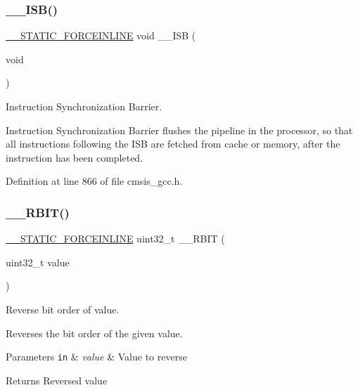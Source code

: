 \subsubsection{\texorpdfstring{\+\_\+\+\_\+\+I\+S\+B()}{\_\_ISB()}}
{\footnotesize\ttfamily \hyperlink{cmsis__iccarm_8h_ab904513442afdf77d4f8c74f23cbb040}{\+\_\+\+\_\+\+S\+T\+A\+T\+I\+C\+\_\+\+F\+O\+R\+C\+E\+I\+N\+L\+I\+NE} void \+\_\+\+\_\+\+I\+SB (\begin{DoxyParamCaption}\item[{void}]{ }\end{DoxyParamCaption})}



Instruction Synchronization Barrier. 

Instruction Synchronization Barrier flushes the pipeline in the processor, so that all instructions following the I\+SB are fetched from cache or memory, after the instruction has been completed. 

Definition at line 866 of file cmsis\+\_\+gcc.\+h.

\mbox{\label{group___c_m_s_i_s___core___instruction_interface_gaf944a7b7d8fd70164cca27669316bcf7}} 
\subsubsection{\texorpdfstring{\+\_\+\+\_\+\+R\+B\+I\+T()}{\_\_RBIT()}}
{\footnotesize\ttfamily \hyperlink{cmsis__iccarm_8h_ab904513442afdf77d4f8c74f23cbb040}{\+\_\+\+\_\+\+S\+T\+A\+T\+I\+C\+\_\+\+F\+O\+R\+C\+E\+I\+N\+L\+I\+NE} uint32\+\_\+t \+\_\+\+\_\+\+R\+B\+IT (\begin{DoxyParamCaption}\item[{uint32\+\_\+t}]{value }\end{DoxyParamCaption})}



Reverse bit order of value. 

Reverses the bit order of the given value. 
\begin{DoxyParams}[1]{Parameters}
\mbox{\tt in}  & {\em value} & Value to reverse \\
\hline
\end{DoxyParams}
\begin{DoxyReturn}{Returns}
Reversed value 
\end{DoxyReturn}


